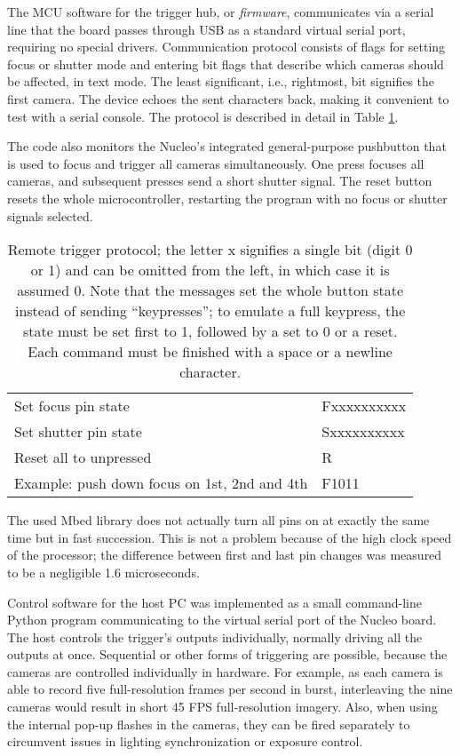 The MCU software for the trigger hub, or \emph{firmware}, communicates via a serial line that the board passes through USB as a standard virtual serial port, requiring no special drivers.
Communication protocol consists of flags for setting focus or shutter mode and entering bit flags that describe which cameras should be affected, in text mode.
The least significant, i.e., rightmost, bit signifies the first camera.
The device echoes the sent characters back, making it convenient to test with a serial console.
The protocol is described in detail in Table \ref{tab:triggerprotocol}.

The code also monitors the Nucleo's integrated general-purpose pushbutton that is used to focus and trigger all cameras simultaneously.
One press focuses all cameras, and subsequent presses send a short shutter signal.
The reset button resets the whole microcontroller, restarting the program with no focus or shutter signals selected.

\begin{table}[t]
	\centering
	\begin{tabular}{l l}
		Set focus pin state & Fxxxxxxxxxx\\
		Set shutter pin state & Sxxxxxxxxxx\\
		Reset all to unpressed & R\\
		Example: push down focus on 1st, 2nd and 4th & F1011\\
	\end{tabular}
	\caption{
		Remote trigger protocol; the letter x signifies a single bit (digit 0 or 1) and can be omitted from the left, in which case it is assumed 0.
		Note that the messages set the whole button state instead of sending ``keypresses'';
		to emulate a full keypress, the state must be set first to 1, followed by a set to 0 or a reset.
		Each command must be finished with a space or a newline character.
	}
	\label{tab:triggerprotocol}
\end{table}

The used Mbed library does not actually turn all pins on at exactly the same time but in fast succession.
This is not a problem because of the high clock speed of the processor;
the difference between first and last pin changes was measured to be a negligible 1.6 microseconds.

Control software for the host PC was implemented as a small command-line Python program communicating to the virtual serial port of the Nucleo board.
The host controls the trigger's outputs individually, normally driving all the outputs at once.
Sequential or other forms of triggering are possible, because the cameras are controlled individually in hardware.
For example, as each camera is able to record five full-resolution frames per second in burst, interleaving the nine cameras would result in short 45 FPS full-resolution imagery.
Also, when using the internal pop-up flashes in the cameras, they can be fired separately to circumvent issues in lighting synchronization or exposure control.

